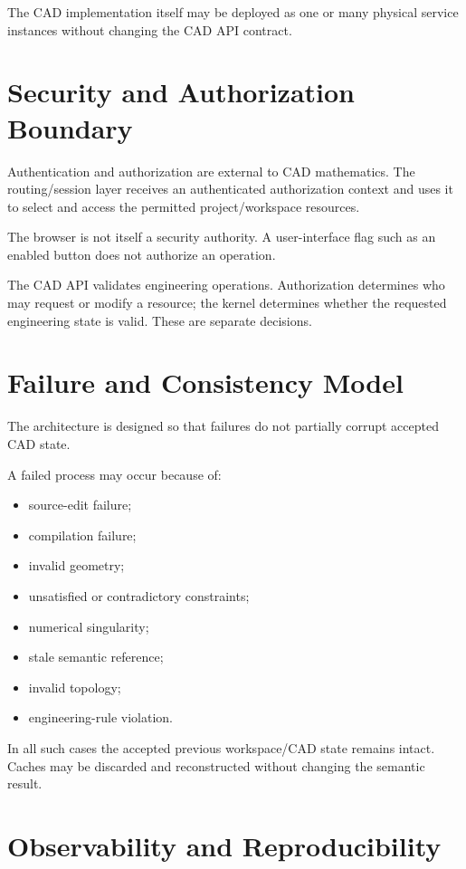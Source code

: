 \documentclass[11pt,a4paper]{article}
\begin{document}
The CAD implementation itself may be deployed as one or many physical service instances without changing the CAD API contract.

\section{Security and Authorization Boundary}

Authentication and authorization are external to CAD mathematics. The routing/session layer receives an authenticated authorization context and uses it to select and access the permitted project/workspace resources.

The browser is not itself a security authority. A user-interface flag such as an enabled button does not authorize an operation.

The CAD API validates engineering operations. Authorization determines who may request or modify a resource; the kernel determines whether the requested engineering state is valid. These are separate decisions.

\section{Failure and Consistency Model}

The architecture is designed so that failures do not partially corrupt accepted CAD state.

A failed process may occur because of:
\begin{itemize}
    \item source-edit failure;
    \item compilation failure;
    \item invalid geometry;
    \item unsatisfied or contradictory constraints;
    \item numerical singularity;
    \item stale semantic reference;
    \item invalid topology;
    \item engineering-rule violation.
\end{itemize}

In all such cases the accepted previous workspace/CAD state remains intact. Caches may be discarded and reconstructed without changing the semantic result.

\section{Observability and Reproducibility}
\end{document}
